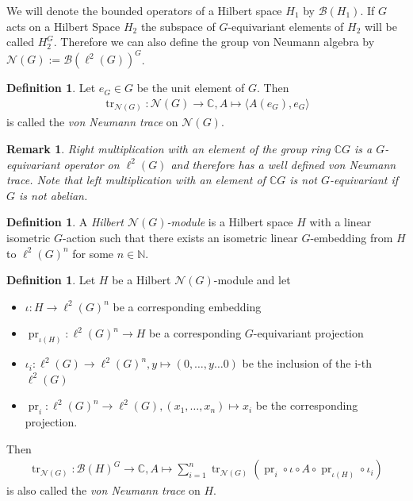 \documentclass[12pt,a4paper]{scrartcl}
\theoremstyle{plain}
\newtheorem{Remark}[Theorem]{Remark}
\theoremstyle{definition}
\newtheorem{Definition}[Theorem]{Definition}
\numberwithin{equation}{section}
\newcommand{\C}{\mathbb{C}} %
\newcommand{\N}{\mathbb{N}} %
\newcommand{\2}{\mathbb{Z} / 2 \mathbb{Z}}
\newcommand{\1}{\bar{1}}
\newcommand{\0}{\bar{0}}
\newcommand{\tr}{\operatorname{tr}}
\newcommand{\pr}{\operatorname{pr}}
\begin{document}
We will denote the bounded operators of a Hilbert space $H_1$ by $\mathcal{B}(H_1)$. If $G$ acts on a Hilbert Space $H_2$ the subspace of $G$-equivariant elements of $H_2$ will be called $H_2^G$. Therefore we can also define the group von Neumann algebra by $\mathcal{N}(G) := \mathcal{B}(\ell^2(G))^G$.
\begin{Definition}
	Let $e_G \in G$ be the unit element of $G$. Then
	\begin{align*}
		\tr_{\mathcal{N}(G)}\colon \mathcal{N}(G) \to \C, A  \mapsto \langle A( e_G), e_G \rangle
	\end{align*}
	is called the \emph{von Neumann trace} on $\mathcal{N}(G)$.
\end{Definition}
\begin{Remark}
	Right multiplication with an element of the group ring $\C G$ is a $G$-equivariant operator on $\ell^2(G)$ and therefore has a well defined von Neumann trace. Note that left multiplication with an element of $\C G$ is not $G$-equivariant if $G$ is not abelian.
\end{Remark}
\begin{Definition}
	A \emph{Hilbert $\mathcal{N}(G)$-module} is a Hilbert space $H$ with a linear isometric $G$-action such that there exists an isometric linear $G$-embedding from $H$ to $\ell^2(G)^n$ for some $n \in \N$.
\end{Definition}
\begin{Definition}
	Let $H$ be a Hilbert $\mathcal{N}(G)$-module and let 
	\begin{itemize}
		\item $\iota\colon H \to \ell^2(G)^n$ be a corresponding embedding 
		\item $\pr_{\iota(H)}\colon \ell^2(G)^n \to H$ be a corresponding $G$-equivariant projection
		\item $\iota_i\colon \ell^2(G) \to \ell^2(G)^n, y \mapsto (0, \ldots, y \ldots 0)$ be the inclusion of the i-th $\ell^2(G)$
		\item $\pr_i\colon \ell^2(G)^n \to \ell^2(G), (x_1, \ldots, x_n) \mapsto x_i$  be the corresponding projection.
	\end{itemize}
	Then 
	\begin{align*}
		\tr_{\mathcal{N}(G)}\colon \mathcal{B}(H)^G \to \C, A \mapsto \sum_{i = 1}^{n} \tr_{\mathcal{N}(G)}(\pr_i \circ \iota \circ A \circ \pr_{\iota(H)} \circ \iota_i)
	\end{align*}
	is also called the \emph{von Neumann trace} on $H$.
\end{Definition}
\end{document}
